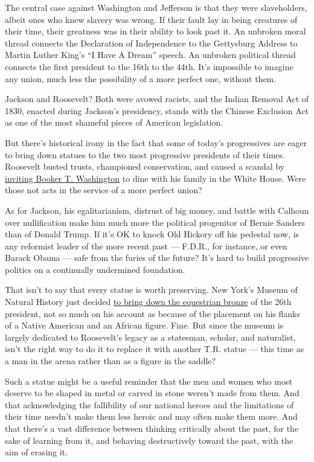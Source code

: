 The central case against Washington and Jefferson is that they were
slaveholders, albeit ones who knew slavery was wrong. If their fault lay
in being creatures of their time, their greatness was in their ability
to look past it. An unbroken moral thread connects the Declaration of
Independence to the Gettysburg Address to Martin Luther King's ``I Have
A Dream'' speech. An unbroken political thread connects the first
president to the 16th to the 44th. It's impossible to imagine any union,
much less the possibility of a more perfect one, without them.

Jackson and Roosevelt? Both were avowed racists, and the Indian Removal
Act of 1830, enacted during Jackson's presidency, stands with the
Chinese Exclusion Act as one of the most shameful pieces of American
legislation.

But there's historical irony in the fact that some of today's
progressives are eager to bring down statues to the two most progressive
presidents of their times. Roosevelt busted trusts, championed
conservation, and caused a scandal by
\href{https://www.npr.org/2012/05/14/152684575/teddy-roosevelts-shocking-dinner-with-washington}{inviting
Booker T. Washington} to dine with his family in the White House. Were
those not acts in the service of a more perfect union?

As for Jackson, his egalitarianism, distrust of big money, and battle
with Calhoun over nullification make him much more the political
progenitor of Bernie Sanders than of Donald Trump. If it's OK to knock
Old Hickory off his pedestal now, is any reformist leader of the more
recent past --- F.D.R., for instance, or even Barack Obama --- safe from
the furies of the future? It's hard to build progressive politics on a
continually undermined foundation.

That isn't to say that every statue is worth preserving. New York's
Museum of Natural History just decided
\href{https://www.nytimes3xbfgragh.onion/2020/06/21/arts/design/roosevelt-statue-to-be-removed-from-museum-of-natural-history.html}{to
bring down the equestrian bronze} of the 26th president, not so much on
his account as because of the placement on his flanks of a Native
American and an African figure. Fine. But since the museum is largely
dedicated to Roosevelt's legacy as a statesman, scholar, and naturalist,
isn't the right way to do it to replace it with another T.R. statue ---
this time as a man in the arena rather than as a figure in the saddle?

Such a statue might be a useful reminder that the men and women who most
deserve to be shaped in metal or carved in stone weren't made from them.
And that acknowledging the fallibility of our national heroes and the
limitations of their time needn't make them less heroic and may often
make them more. And that there's a vast difference between thinking
critically about the past, for the sake of learning from it, and
behaving destructively toward the past, with the aim of erasing it.

